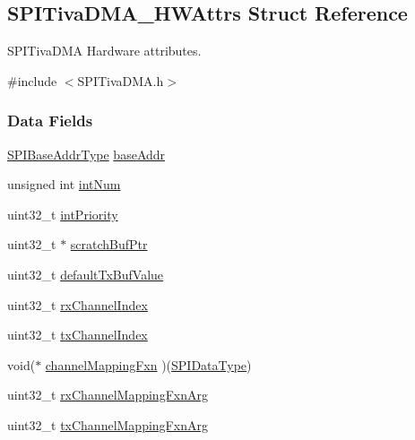 \subsection{S\+P\+I\+Tiva\+D\+M\+A\+\_\+\+H\+W\+Attrs Struct Reference}
\label{struct_s_p_i_tiva_d_m_a___h_w_attrs}


S\+P\+I\+Tiva\+D\+M\+A Hardware attributes.  




{\ttfamily \#include $<$S\+P\+I\+Tiva\+D\+M\+A.\+h$>$}

\subsubsection*{Data Fields}
\begin{DoxyCompactItemize}
\item 
\hyperlink{_s_p_i_c_c3200_d_m_a_8h_a4b7e9f3739f6196bed13f9c3c549c96d}{S\+P\+I\+Base\+Addr\+Type} \hyperlink{struct_s_p_i_tiva_d_m_a___h_w_attrs_a3264130b8293c92d7556f4288da9e6c3}{base\+Addr}
\item 
unsigned int \hyperlink{struct_s_p_i_tiva_d_m_a___h_w_attrs_aa3c30677a08faf98b923022684288727}{int\+Num}
\item 
uint32\+\_\+t \hyperlink{struct_s_p_i_tiva_d_m_a___h_w_attrs_ab591cf70d0b7c2f4b22d29b78c9fcf7c}{int\+Priority}
\item 
uint32\+\_\+t $\ast$ \hyperlink{struct_s_p_i_tiva_d_m_a___h_w_attrs_a91c1a3a97cc28823bdfebd0fdc659a26}{scratch\+Buf\+Ptr}
\item 
uint32\+\_\+t \hyperlink{struct_s_p_i_tiva_d_m_a___h_w_attrs_a9b0752c53408495fb1dfe9358668e023}{default\+Tx\+Buf\+Value}
\item 
uint32\+\_\+t \hyperlink{struct_s_p_i_tiva_d_m_a___h_w_attrs_af18c0efa81dbb2ec14fe1a77b759d7db}{rx\+Channel\+Index}
\item 
uint32\+\_\+t \hyperlink{struct_s_p_i_tiva_d_m_a___h_w_attrs_af2833557c6725d3edf86b4f72543cf1c}{tx\+Channel\+Index}
\item 
void($\ast$ \hyperlink{struct_s_p_i_tiva_d_m_a___h_w_attrs_a6a44a95374c9bf112964309fcffc0778}{channel\+Mapping\+Fxn} )(\hyperlink{_s_p_i_c_c3200_d_m_a_8h_ac69c2f2d8cda29733c058bf8e0233af7}{S\+P\+I\+Data\+Type})
\item 
uint32\+\_\+t \hyperlink{struct_s_p_i_tiva_d_m_a___h_w_attrs_abae80f97226457864feb654117217f66}{rx\+Channel\+Mapping\+Fxn\+Arg}
\item 
uint32\+\_\+t \hyperlink{struct_s_p_i_tiva_d_m_a___h_w_attrs_a58b59e083a9e324970d63c46f3342afe}{tx\+Channel\+Mapping\+Fxn\+Arg}
\end{DoxyCompactItemize}



